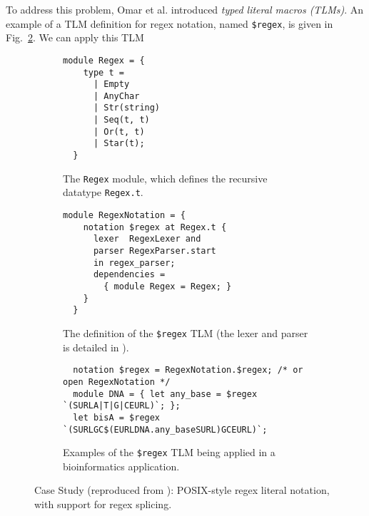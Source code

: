 \documentclass[acmsmall,review]{acmart}
\newcommand{\li}[1]{\lstinline[basicstyle=\ttfamily\fontsize{9pt}{1em}\selectfont]{#1}}
\theoremstyle{slplain}
\numberwithin{thm}{section}
\begin{document}
To address this problem, Omar et al. \cite{TLMs-paper} introduced \emph{typed literal macros (TLMs)}. An example of a TLM definition for regex notation, named \li{$regex}, is given in Fig.~\ref{fig:regex-tlm-def}. We can apply this TLM  

\begin{figure}[t]
\begin{subfigure}[t]{0.45\textwidth}
\vspace{-1px}
\begin{lstlisting}[mathescape=~]
  module Regex = {
    type t = 
      | Empty
      | AnyChar 
      | Str(string)
      | Seq(t, t) 
      | Or(t, t) 
      | Star(t);
  }
\end{lstlisting}
\vspace{-5px}
\caption{The \li{Regex} module, which defines the recursive datatype \li{Regex.t}.}
\label{fig:Regex-module-def}
\end{subfigure}
\hfill
\begin{subfigure}[t]{0.53\textwidth}
\vspace{-1px}
\begin{lstlisting}[mathescape=|]
  module RegexNotation = {
    notation $regex at Regex.t {
      lexer  RegexLexer and 
      parser RegexParser.start
      in regex_parser;
      dependencies = 
        { module Regex = Regex; }
    }
  }
\end{lstlisting}
\vspace{-5px}
\caption{The definition of the \li{$regex} TLM (the lexer and parser is detailed in \cite{TLMs-paper}).}
\label{fig:regex-tlm-def}
\end{subfigure}

\begin{subfigure}[t]{\textwidth}
\vspace{5px}
\begin{lstlisting}
  notation $regex = RegexNotation.$regex; /* or open RegexNotation */
  module DNA = { let any_base = $regex `(SURLA|T|G|CEURL)`; };
  let bisA = $regex `(SURLGC$(EURLDNA.any_baseSURL)GCEURL)`;
\end{lstlisting}
\vspace{-4px}
\caption{Examples of the \li{$regex} TLM being applied in a bioinformatics application. %
}
\label{fig:first-tlm-example}
\end{subfigure}
\vspace{5px}
\caption{Case Study (reproduced from \cite{TLMs-paper}): POSIX-style regex literal notation, with support for regex splicing.}
\label{fig:regex-case-study}
\end{figure}
\end{document}
